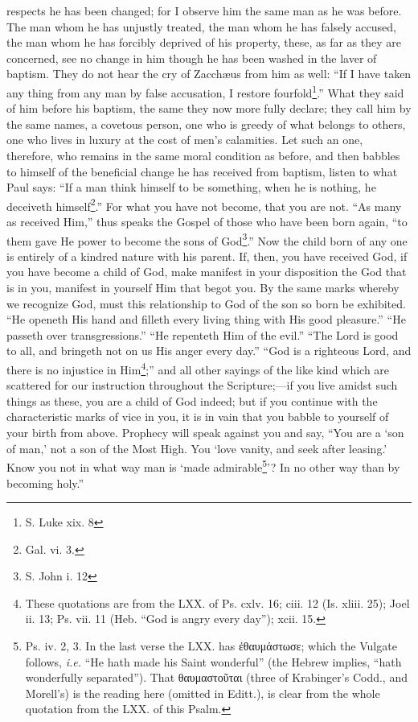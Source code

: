 respects he has been changed; for I observe him the same man as he was before. The man whom he has unjustly treated, the man whom he has falsely accused, the man whom he has forcibly deprived of his property, these, as far as they are concerned, see no change in him though he has been washed in the laver of baptism. They do not hear the cry of Zacchæus from him as well: “If I have taken any thing from any man by false accusation, I restore fourfold\footnote{S. Luke xix. 8}.” What they said of him before his baptism, the same they now more fully declare; they call him by the same names, a covetous person, one who is greedy of what belongs to others, one who lives in luxury at the cost of men’s calamities. Let such an one, therefore, who remains in the same moral condition as before, and then babbles to himself of the beneficial change he has received from baptism, listen to what Paul says: “If a man think himself to be something, when he is nothing, he deceiveth himself\footnote{Gal. vi. 3.}.” For what you have not become, that you are not. “As many as received Him,” thus speaks the Gospel of those who have been born again, “to them gave He power to become the sons of God\footnote{S. John i. 12}.” Now the child born of any one is entirely of a kindred nature with his parent. If, then, you have received God, if you have become a child of God, make manifest in your disposition the God that is in you, manifest in yourself Him that begot you. By the same marks whereby we recognize God, must this relationship to God of the son so born be exhibited. “He openeth His hand and filleth every living thing with His good pleasure.” “He passeth over transgressions.” “He repenteth Him of the evil.” “The Lord is good to all, and bringeth not on us His anger every day.” “God is a righteous Lord, and there is no injustice in Him\footnote{These quotations are from the LXX. of Ps. cxlv. 16; ciii. 12 (Is. xliii. 25); Joel ii. 13; Ps. vii. 11 (Heb. “God is angry every day”); xcii. 15.};” and all other sayings of the like kind which are scattered for our instruction throughout the Scripture;—if you live amidst such things as these, you are a child of God indeed; but if you continue with the characteristic marks of vice in you, it is in vain that you babble to yourself of your birth from above. Prophecy will speak against you and say, “You are a ‘son of man,’ not a son of the Most High. You ‘love vanity, and seek after leasing.’ Know you not in what way man is ‘made admirable\footnote{Ps. iv. 2, 3. In the last verse the LXX. has \textgreek{ἐθαυμάστωσε}; which the Vulgate follows, \emph{i.e.} “He hath made his Saint wonderful” (the Hebrew implies, “hath wonderfully separated”). That \textgreek{θαυμαστοῦται} (three of Krabinger’s Codd., and Morell’s) is the reading here (omitted in Editt.), is clear from the whole quotation from the LXX. of this Psalm.}’? In no other way than by becoming holy.”

